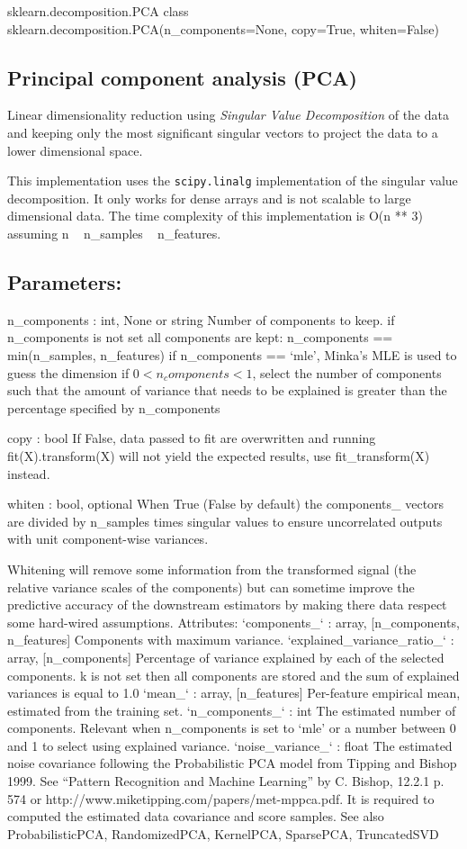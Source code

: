 sklearn.decomposition.PCA
class sklearn.decomposition.PCA(n_components=None, copy=True, whiten=False)
\subsection*{Principal component analysis (PCA)}

Linear dimensionality reduction using \textit{Singular Value Decomposition} of the data and keeping only the most significant singular vectors to project the data to a lower dimensional space.

This implementation uses the \texttt{scipy.linalg} implementation of the singular value decomposition. It only works for dense arrays and is not scalable to large dimensional data.
The time complexity of this implementation is O(n ** 3) assuming n ~ n_samples ~ n_features.

\subsection*{Parameters:} 
 
\item n\_components : int, None or string
Number of components to keep. if n_components is not set all components are kept:
n_components == min(n_samples, n_features)
if n_components == ‘mle’, Minka’s MLE is used to guess the dimension if $0 < n_components < 1$, select the number of components such that the amount of variance that needs to be explained is greater than the percentage specified by n_components
\item copy : bool
If False, data passed to fit are overwritten and running fit(X).transform(X) will not yield the expected results, use fit_transform(X) instead.
\item whiten : bool, optional
When True (False by default) the components_ vectors are divided by n_samples times singular values to ensure uncorrelated outputs with unit component-wise variances.
 

Whitening will remove some information from the transformed signal (the relative variance scales of the components) but can sometime improve the predictive accuracy of the downstream estimators by making there data respect some hard-wired assumptions.
Attributes: 
`components_` : array, [n_components, n_features]
Components with maximum variance.
`explained_variance_ratio_` : array, [n_components]
Percentage of variance explained by each of the selected components. k is not set then all components are stored and the sum of explained variances is equal to 1.0
`mean_` : array, [n_features]
Per-feature empirical mean, estimated from the training set.
`n_components_` : int
The estimated number of components. Relevant when n_components is set to ‘mle’ or a number between 0 and 1 to select using explained variance.
`noise_variance_` : float
The estimated noise covariance following the Probabilistic PCA model from Tipping and Bishop 1999. See “Pattern Recognition and Machine Learning” by C. Bishop, 12.2.1 p. 574 or http://www.miketipping.com/papers/met-mppca.pdf. It is required to computed the estimated data covariance and score samples.
See also ProbabilisticPCA, RandomizedPCA, KernelPCA, SparsePCA, TruncatedSVD
